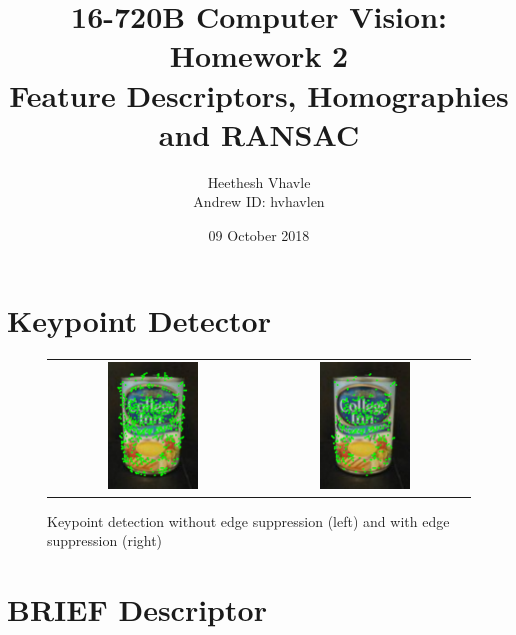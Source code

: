 \documentclass[a4paper]{article}
\title{16-720B Computer Vision: Homework 2 \\
Feature Descriptors, Homographies and RANSAC}
\author{Heethesh Vhavle\\
Andrew ID: hvhavlen}
\date{09 October 2018}
\begin{document}
\maketitle

\section{Keypoint Detector}

\begin{figure}[!ht]
\centering
\begin{tabular}{cc}
{\includegraphics[width=0.45\textwidth]{images/poi_edges}} &
{\includegraphics[width=0.45\textwidth]{images/poi}}
\end{tabular}
\caption{Keypoint detection without edge suppression (left) and with edge suppression (right)}
\end{figure}

\newpage
\section{BRIEF Descriptor}
\end{document}
